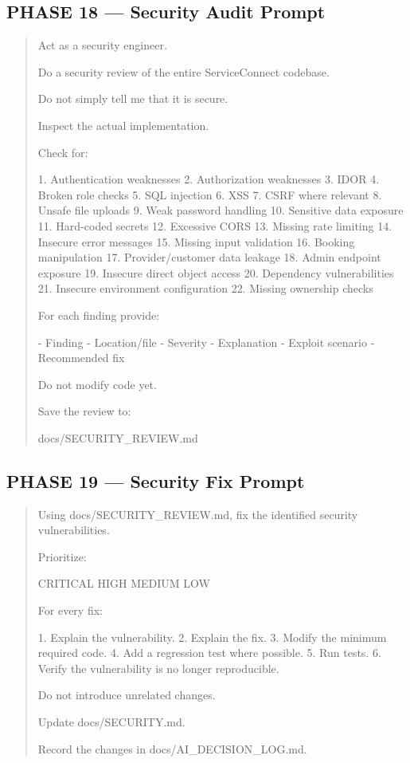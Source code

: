 \subsection*{PHASE 18 --- Security Audit Prompt}

\begin{quote}
Act as a security engineer.

Do a security review of the entire ServiceConnect codebase.

Do not simply tell me that it is secure.

Inspect the actual implementation.

Check for:

1. Authentication weaknesses
2. Authorization weaknesses
3. IDOR
4. Broken role checks
5. SQL injection
6. XSS
7. CSRF where relevant
8. Unsafe file uploads
9. Weak password handling
10. Sensitive data exposure
11. Hard-coded secrets
12. Excessive CORS
13. Missing rate limiting
14. Insecure error messages
15. Missing input validation
16. Booking manipulation
17. Provider/customer data leakage
18. Admin endpoint exposure
19. Insecure direct object access
20. Dependency vulnerabilities
21. Insecure environment configuration
22. Missing ownership checks

For each finding provide:

- Finding
- Location/file
- Severity
- Explanation
- Exploit scenario
- Recommended fix

Do not modify code yet.

Save the review to:

docs/SECURITY_REVIEW.md
\end{quote}

\subsection*{PHASE 19 --- Security Fix Prompt}

\begin{quote}
Using docs/SECURITY_REVIEW.md, fix the identified security vulnerabilities.

Prioritize:

CRITICAL
HIGH
MEDIUM
LOW

For every fix:

1. Explain the vulnerability.
2. Explain the fix.
3. Modify the minimum required code.
4. Add a regression test where possible.
5. Run tests.
6. Verify the vulnerability is no longer reproducible.

Do not introduce unrelated changes.

Update docs/SECURITY.md.

Record the changes in docs/AI_DECISION_LOG.md.
\end{quote}

